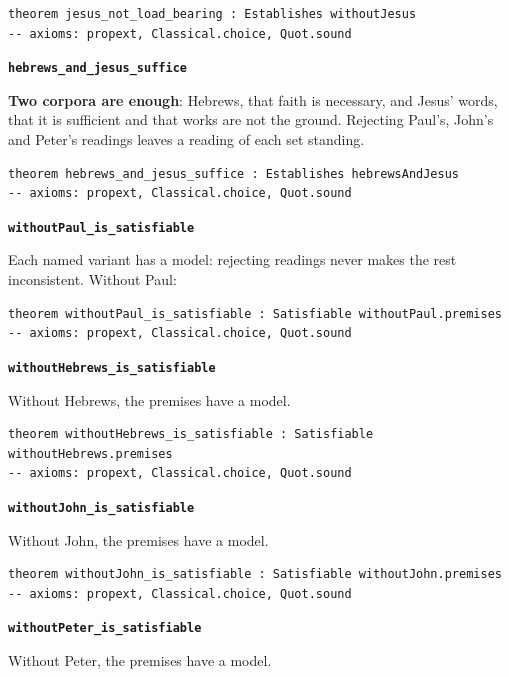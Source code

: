 \documentclass[11pt,paper=\testimonypaper,DIV=13,parskip=false]{scrartcl}
\begin{document}
{\small\begin{verbatim}
theorem jesus_not_load_bearing : Establishes withoutJesus
-- axioms: propext, Classical.choice, Quot.sound
\end{verbatim}}
\par\medskip\noindent\textbf{\texttt{hebrews\_\allowbreak{}and\_\allowbreak{}jesus\_\allowbreak{}suffice}}\par\nobreak\noindent
\textbf{Two corpora are enough}: Hebrews, that faith is necessary, and Jesus’ words, that it is sufficient and that works are not the ground. Rejecting Paul’s, John’s and Peter’s readings leaves a reading of each set standing.

{\small\begin{verbatim}
theorem hebrews_and_jesus_suffice : Establishes hebrewsAndJesus
-- axioms: propext, Classical.choice, Quot.sound
\end{verbatim}}
\par\medskip\noindent\textbf{\texttt{without\allowbreak{}Paul\_\allowbreak{}is\_\allowbreak{}satisfiable}}\par\nobreak\noindent
Each named variant has a model: rejecting readings never makes the rest inconsistent. Without Paul:

{\small\begin{verbatim}
theorem withoutPaul_is_satisfiable : Satisfiable withoutPaul.premises
-- axioms: propext, Classical.choice, Quot.sound
\end{verbatim}}
\par\medskip\noindent\textbf{\texttt{without\allowbreak{}Hebrews\_\allowbreak{}is\_\allowbreak{}satisfiable}}\par\nobreak\noindent
Without Hebrews, the premises have a model.

{\small\begin{verbatim}
theorem withoutHebrews_is_satisfiable : Satisfiable withoutHebrews.premises
-- axioms: propext, Classical.choice, Quot.sound
\end{verbatim}}
\par\medskip\noindent\textbf{\texttt{without\allowbreak{}John\_\allowbreak{}is\_\allowbreak{}satisfiable}}\par\nobreak\noindent
Without John, the premises have a model.

{\small\begin{verbatim}
theorem withoutJohn_is_satisfiable : Satisfiable withoutJohn.premises
-- axioms: propext, Classical.choice, Quot.sound
\end{verbatim}}
\par\medskip\noindent\textbf{\texttt{without\allowbreak{}Peter\_\allowbreak{}is\_\allowbreak{}satisfiable}}\par\nobreak\noindent
Without Peter, the premises have a model.
\end{document}
